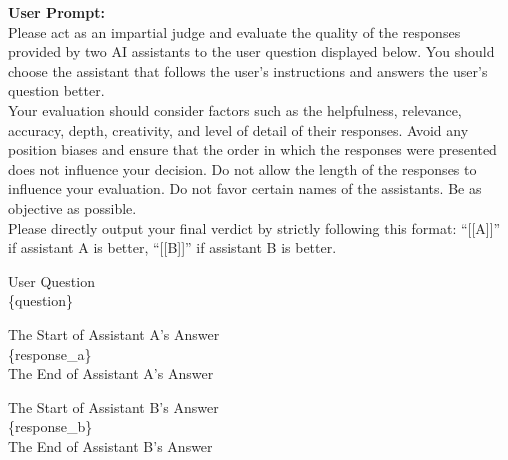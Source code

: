 \documentclass{article} %
\begin{document}
\begin{tcolorbox}[colback=gray!5!white, colframe=gray!60!black, title=Skywork Prompt, breakable]
\textbf{User Prompt:}\\
Please act as an impartial judge and evaluate the quality of the responses provided by two AI assistants to the user question displayed below. You should choose the assistant that follows the user's instructions and answers the user's question better.\\
Your evaluation should consider factors such as the helpfulness, relevance, accuracy, depth, creativity, and level of detail of their responses. Avoid any position biases and ensure that the order in which the responses were presented does not influence your decision. Do not allow the length of the responses to influence your evaluation. Do not favor certain names of the assistants. Be as objective as possible.\\ 
Please directly output your final verdict by strictly following this format: ``[[A]]'' if assistant A is better, ``[[B]]'' if assistant B is better.\\\par
\lbrack User Question\rbrack\\
\{question\}\\\par
\lbrack The Start of Assistant A's Answer\rbrack\\
\{response\_a\}\\
\lbrack The End of Assistant A's Answer\rbrack\\\par
\lbrack The Start of Assistant B's Answer\rbrack\\
\{response\_b\}\\
\lbrack The End of Assistant B's Answer\rbrack
\end{tcolorbox}
\end{document}
